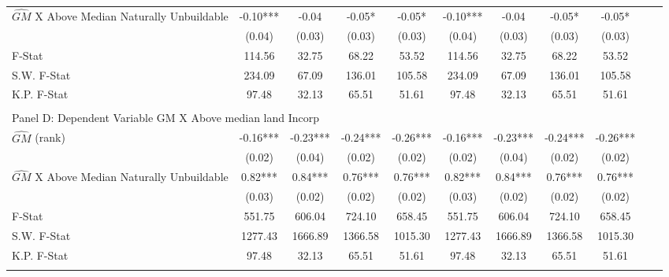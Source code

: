 \begin{table}[htbp]
\begin{threeparttable}
\begin{tabular}{l*{10}{c}}
\addlinespace
$\hat{GM}$ X Above Median Naturally Unbuildable&      -0.10***&      -0.04   &      -0.05*  &      -0.05*  &      -0.10***&      -0.04   &      -0.05*  &      -0.05*  \\
                &     (0.04)   &     (0.03)   &     (0.03)   &     (0.03)   &     (0.04)   &     (0.03)   &     (0.03)   &     (0.03)   \\
\midrule
F-Stat          &     114.56   &      32.75   &      68.22   &      53.52   &     114.56   &      32.75   &      68.22   &      53.52   \\
S.W. F-Stat     &     234.09   &      67.09   &     136.01   &     105.58   &     234.09   &      67.09   &     136.01   &     105.58   \\
K.P. F-Stat     &      97.48   &      32.13   &      65.51   &      51.61   &      97.48   &      32.13   &      65.51   &      51.61   \\
\cmidrule[\heavyrulewidth](lr){1-9} \\ \cmidrule[\heavyrulewidth](lr){1-9}
\multicolumn{8}{l}{Panel D: Dependent Variable GM X Above median land Incorp}\\
\cmidrule(lr){1-9}
$\hat{GM}$ (rank)&      -0.16***&      -0.23***&      -0.24***&      -0.26***&      -0.16***&      -0.23***&      -0.24***&      -0.26***\\
                &     (0.02)   &     (0.04)   &     (0.02)   &     (0.02)   &     (0.02)   &     (0.04)   &     (0.02)   &     (0.02)   \\
\addlinespace
$\hat{GM}$ X Above Median Naturally Unbuildable&       0.82***&       0.84***&       0.76***&       0.76***&       0.82***&       0.84***&       0.76***&       0.76***\\
                &     (0.03)   &     (0.02)   &     (0.02)   &     (0.02)   &     (0.03)   &     (0.02)   &     (0.02)   &     (0.02)   \\
\midrule
F-Stat          &     551.75   &     606.04   &     724.10   &     658.45   &     551.75   &     606.04   &     724.10   &     658.45   \\
S.W. F-Stat     &    1277.43   &    1666.89   &    1366.58   &    1015.30   &    1277.43   &    1666.89   &    1366.58   &    1015.30   \\
K.P. F-Stat     &      97.48   &      32.13   &      65.51   &      51.61   &      97.48   &      32.13   &      65.51   &      51.61   \\
\cmidrule[\heavyrulewidth](lr){1-9} \\ \cmidrule[\heavyrulewidth](lr){1-9}

\end{tabular}
\end{threeparttable}
\end{table}

